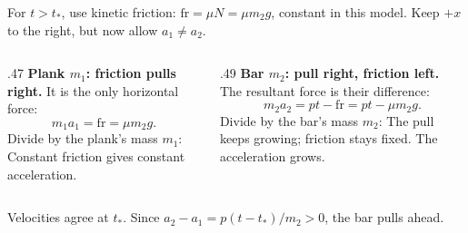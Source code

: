 \begin{solutionframe}
  \par
  For \(t>t_*\), use kinetic friction:
  \(\mathrm{fr}=\mu N=\mu m_2g\), constant in this model.
  Keep \(+x\) to the right, but now allow \(a_1\ne a_2\).

  \medskip
  \begin{columns}[T,onlytextwidth]
    \begin{column}{.47\textwidth}
      \textbf{Plank \(m_1\): friction pulls right.}
      It is the only horizontal force:
      \[
        m_1a_1=\mathrm{fr}=\mu m_2g.
      \]
      Divide by the plank's mass \(m_1\):
      Constant friction gives constant acceleration.
    \end{column}
    \begin{column}{.49\textwidth}
      \textbf{Bar \(m_2\): pull right, friction left.}
      The resultant force is their difference:
      \[
        m_2a_2=pt-\mathrm{fr}=pt-\mu m_2g.
      \]
      Divide by the bar's mass \(m_2\):
      The pull keeps growing; friction stays fixed. The acceleration grows.
    \end{column}
  \end{columns}
  \medskip
  Velocities agree at \(t_*\). Since \(a_2-a_1=p(t-t_*)/m_2>0\), the bar pulls ahead.
\end{solutionframe}

